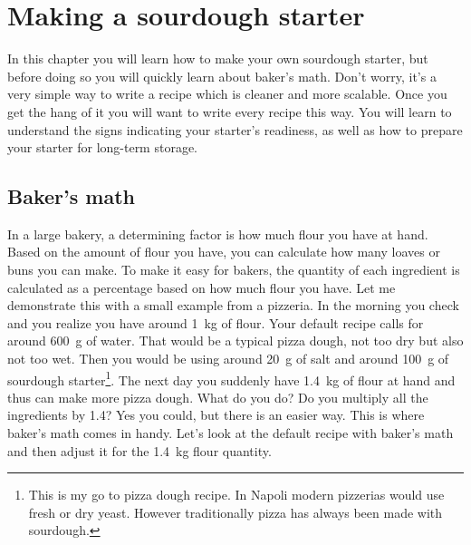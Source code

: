 \chapter{Making a sourdough starter}%
\label{ch:sourdough-starter}
\begin{quoting}
In this chapter you will learn how to make your
own sourdough starter, but before doing so you will
quickly learn about baker's math. Don't worry,
it's a very simple way to write a recipe which
is cleaner and more scalable. Once you get the hang
of it you will want to write every recipe this way.
You will learn to understand the signs indicating
your starter's readiness, as well as
how to prepare your starter for long-term storage.
\end{quoting}

\section{Baker's math}%
\label{sec:bakers-math}

In a large bakery, a determining factor is how
much flour you have at hand. Based on the amount
of flour you have, you can calculate how many
loaves or buns you can make. To make it easy
for bakers, the quantity of each ingredient
is calculated as a percentage based on how much flour you have.
Let me demonstrate this with a small example from
a pizzeria. In the morning you check and you realize you
have around \qty{1}{\kg} of flour.
Your default recipe calls for around \qty{600}{\gram} of water.
That would be a typical pizza dough, not too dry but
also not too wet. Then you would be using around \qty{20}{\gram}
of salt and around \qty{100}{\gram} of sourdough starter\footnote{This is my go to
pizza dough recipe. In Napoli modern pizzerias would use fresh or dry yeast.
However traditionally pizza has always been made with sourdough.}.
The next day you suddenly have \qty{1.4}{\kg} of flour
at hand and thus can make more pizza dough. What do you do?
Do you multiply all the ingredients by \num{1.4}? Yes you could,
but there is an easier way. This is where baker's math
comes in handy. Let's look at the default recipe with baker's
math and then adjust it for the \qty{1.4}{\kg} flour quantity.

\begin{table}[!htb]
\centering
  
  \caption[Baker's math example]{An example table demonstrating how to
      properly calculate using baker's math}
\end{table}

